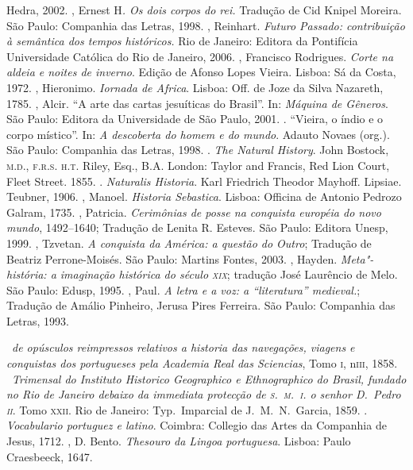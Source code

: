 \begin{bibliohedra}
Hedra, 2002.
, Ernest H\textit{. Os dois corpos do rei.} Tradução de Cid
Knipel Moreira. São Paulo: Companhia das Letras, 1998.
, Reinhart. \textit{Futuro Passado: contribuição à
semântica dos tempos históricos.}  Rio de Janeiro: Editora da
Pontifícia Universidade Católica do Rio de Janeiro, 2006.
, Francisco Rodrigues. \textit{Corte na aldeia e noites de inverno}.
Edição de Afonso Lopes Vieira. Lisboa: Sá da
Costa, 1972.
, Hieronimo. \textit{Iornada de Africa}.
Lisboa: Off. de Joze da Silva Nazareth, 1785.
, Alcir. ``A arte das cartas jesuíticas do Brasil''. In: \textit{Máquina de
Gêneros}. São Paulo: Editora da Universidade de São Paulo, 2001. 
\titidem. ``Vieira, o índio e o corpo místico''. In: \textit{A
descoberta do homem e do mundo}. Adauto Novaes (org.). São Paulo:
Companhia das Letras, 1998.
. \textit{The Natural History}. John Bostock, \textsc{m.d., f.r.s.
h.t.} Riley, Esq., B.A. London: Taylor and Francis, Red Lion Court,
Fleet Street. 1855.
\titidem. \textit{Naturalis Historia}. Karl Friedrich Theodor
Mayhoff. Lipsiae. Teubner, 1906.
, Manoel. \textit{Historia Sebastica}. Lisboa: Officina de Antonio Pedrozo Galram, 1735. 
, Patricia. \textit{Cerimônias de posse na conquista européia do novo mundo}, 1492--1640; 
Tradução de Lenita R. Esteves. São Paulo: Editora
Unesp, 1999.
, Tzvetan. \textit{A conquista da América: a questão do Outro}; Tradução de 
Beatriz Perrone-Moisés. São Paulo: Martins Fontes, 2003.
, Hayden. \textit{Meta"-história: a imaginação histórica do século \textsc{xix}};
tradução José Laurêncio de Melo. São Paulo: Edusp, 1995.
, Paul. \textit{A letra e a voz: a ``literatura'' medieval.}; Tradução de Amálio
Pinheiro, Jerusa Pires Ferreira. São Paulo: Companhia das Letras, 1993.

\medskip
{}

\ \textit{de opúsculos reimpressos relativos a historia
das navegações, viagens e conquistas dos portugueses pela Academia Real
das Sciencias}, Tomo \textsc{i}, n\oi \textsc{iii}, 1858.
\ \textit{Trimensal do Instituto Historico Geographico e
Ethnographico do Brasil, fundado no Rio de Janeiro debaixo da immediata
protecção de \textsc{s.~m.~i.} o senhor D.~Pedro \textsc{ii}}. Tomo \textsc{xxii}. Rio de Janeiro:
Typ.~Imparcial de J.~M.~N.~Garcia, 1859.
. \textit{Vocabulario portuguez e latino}. Coimbra: Collegio das Artes da Companhia de
Jesus, 1712.
, D. Bento. \textit{Thesouro da Lingoa portuguesa}. Lisboa: Paulo Craesbeeck, 1647.
\end{bibliohedra}
